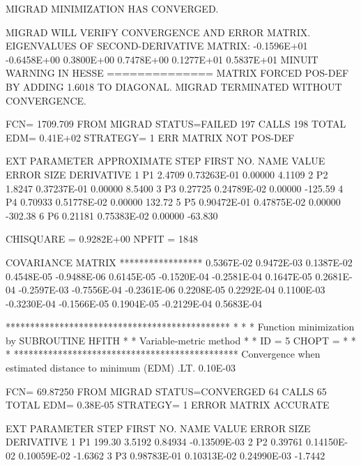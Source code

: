\begin{Listing}
{ MIGRAD MINIMIZATION HAS CONVERGED.

 MIGRAD WILL VERIFY CONVERGENCE AND ERROR MATRIX.
 EIGENVALUES OF SECOND-DERIVATIVE MATRIX:
        -0.1596E+01 -0.6458E+00  0.3800E+00  0.7478E+00  0.1277E+01  0.5837E+01
 MINUIT WARNING IN HESSE   
 ============== MATRIX FORCED POS-DEF BY ADDING   1.6018     TO DIAGONAL.
 MIGRAD TERMINATED WITHOUT CONVERGENCE.

 FCN=   1709.709     FROM MIGRAD    STATUS=FAILED       197 CALLS      198 TOTAL
                     EDM=  0.41E+02    STRATEGY= 1      ERR MATRIX NOT POS-DEF

  EXT PARAMETER                APPROXIMATE        STEP         FIRST   
  NO.   NAME        VALUE          ERROR          SIZE      DERIVATIVE 
   1      P1        2.4709       0.73263E-01   0.00000        4.1109    
   2      P2        1.8247       0.37237E-01   0.00000        8.5400    
   3      P3       0.27725       0.24789E-02   0.00000       -125.59    
   4      P4       0.70933       0.51778E-02   0.00000        132.72    
   5      P5       0.90472E-01   0.47875E-02   0.00000       -302.38    
   6      P6       0.21181       0.75383E-02   0.00000       -63.830    

 CHISQUARE = 0.9282E+00  NPFIT = 1848

  COVARIANCE MATRIX
  *****************
  0.5367E-02 
  0.9472E-03   0.1387E-02 
  0.4548E-05  -0.9488E-06   0.6145E-05 
 -0.1520E-04  -0.2581E-04   0.1647E-05   0.2681E-04 
 -0.2597E-03  -0.7556E-04  -0.2361E-06   0.2208E-05   0.2292E-04 
  0.1100E-03  -0.3230E-04  -0.1566E-05   0.1904E-05  -0.2129E-04   0.5683E-04 

     **********************************************
     *                                            *
     * Function minimization by SUBROUTINE HFITH  *
     * Variable-metric method                     *
     * ID =          5  CHOPT =                   *
     *                                            *
     **********************************************
 Convergence when estimated distance to minimum (EDM) .LT.  0.10E-03

 FCN=   69.87250     FROM MIGRAD    STATUS=CONVERGED     64 CALLS       65 TOTAL
                     EDM=  0.38E-05    STRATEGY= 1      ERROR MATRIX ACCURATE 

  EXT PARAMETER                                   STEP         FIRST   
  NO.   NAME        VALUE          ERROR          SIZE      DERIVATIVE 
   1      P1        199.30        3.5192       0.84934      -0.13509E-03
   2      P2       0.39761       0.14150E-02   0.10059E-02   -1.6362    
   3      P3       0.98783E-01   0.10313E-02   0.24990E-03   -1.7442    

}
\end{Listing}
